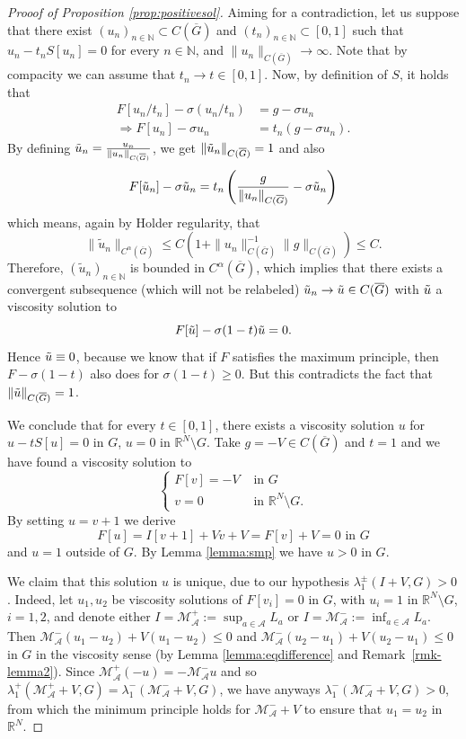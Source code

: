 \documentclass[a4paper,11pt]{article}
\newcommand{\R}{\mathbb{R}}
\newcommand{\N}{\mathbb{N}}
\newcommand{\M}{\mathcal{M}}
\newcommand{\I}{I}
\begin{document}
\begin{proof}[Prooof of Proposition \ref{prop:positivesol}]
Aiming for a contradiction, let us suppose that there exist $(u_n)_{n\in \N} \subset C(\overline{G})$ and $(t_n)_{n\in \N} \subset [0,1]$ such that $u_n - t_n S[u_n] = 0$ for every $n\in \N$, and $\|u_n\|_{C(\overline{G})} \rightarrow \infty$. Note that by compacity we can assume that $t_n \rightarrow t\in [0,1]$. Now, by definition of $S$, it holds that
\begin{align*}
F\left[u_n / t_n\right]-\sigma\left(u_n / t_n\right)&=g-\sigma u_n \\
\Rightarrow F[u_n] - \sigma u_n &= t_n (g - \sigma u_n) .
\end{align*}
By defining $\Tilde{u}_n = \frac{u_n}{\|u_n\|_{C(\overline{G})}}$, we get $\|\Tilde{u}_n\|_{C(\overline{G})} = 1$ and also
\[F[\Tilde{u}_n] - \sigma \Tilde{u}_n = t_n \left( \frac{g}{\|u_n \|_{C(\overline{G})}} - \sigma\Tilde{u}_n\right)\]
which means, again by Holder regularity, that
\[\|\tilde u_n \|_{C^{\alpha}(\overline{G})} \leq C(1 + \|u_n \|^{-1}_{C(\overline{G})} \|g\|_{C(\overline{G})}) \leq C.\]
Therefore, $(\tilde{u}_n)_{n\in \N}$ is bounded in $C^{\alpha}(\overline{G})$, which implies that there exists a convergent subsequence (which will not be relabeled) $\Tilde{u}_n \rightarrow \Tilde{u} \in C(\overline{G})$ with $\Tilde{u}$ a viscosity solution to
\[F[\Tilde{u}] - \sigma (1-t) \Tilde{u} = 0.\]
Hence $\Tilde{u} \equiv 0$, because we know that if $F$ satisfies the maximum principle, then $F-\sigma (1-t) $ also does for $\sigma (1-t) \geq 0$. But this contradicts the fact that $\|\Tilde{u}\|_{C(\overline{G})} =1$.

We conclude that for every $t\in [0,1]$, there exists a viscosity solution $u$ for $u-tS[u] = 0$ in $G$, $u=0$ in $\R^N\setminus G$. Take $g = -V \in C(\overline{G})$ and $t=1$ and we have found a viscosity solution to
\[\begin{cases}
F[v] = -V &\text{ in } G\\
v= 0 & \text{ in } \R^N\setminus G.
\end{cases}\]
By setting $u= v + 1$ we derive
\[F[u] = \I[v + 1] + Vv + V = F[v] +V = 0 \text{ in }G\]
and $u = 1$ outside of $G$. By Lemma \ref{lemma:smp} we have $u>0$ in $G$.

We claim that this solution $u$ is unique, due to our hypothesis $\lambda_1^\pm (I+V,G)>0$. 
Indeed, let $u_1, u_2$ be viscosity solutions of $F[v_i]=0$ in $G$, with $u_i =1$ in $\R^N\setminus G$, $i=1,2$, and denote either $I=\M^+_{\mathcal{A}}:=\sup_{a\in \mathcal{A}} L_a $ or $I=\M^-_{\mathcal{A}}:= \inf_{a\in \mathcal{A}} L_a$.  Then $\M^-_{ \mathcal{A}} (u_1-u_2) + V(u_1-u_2)\le 0$ and $\M^-_{\mathcal{A}} (u_2-u_1) + V(u_2-u_1)\le 0$ in $G$ in the viscosity sense (by Lemma \ref{lemma:eqdifference} and Remark~\ref{rmk-lemma2}). 
Since $\M^+_{ \mathcal{A}} (-u)=-\M^-_{ \mathcal{A}}u$ and so
 $\lambda_1^+(\M^+_{ \mathcal{A}}+V,G)=\lambda_1^-(\M^-_{\mathcal{A}}+V,G)$, we have anyways $\lambda_1^-(\M^-_{\mathcal{A}}+V,G) >0$, from which the minimum principle holds for $\M^-_{\mathcal{A}}+V$ to ensure that $u_1 =u_2$ in $\R^N$. 


\end{proof}
\end{document}
